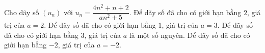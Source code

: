 \begin{ex}
Cho dãy số $(u_n)$ với $u_n=\dfrac{4n^2+n+2}{an^2+5}$.
\choiceTF
{\True Để dãy số đã cho có giới hạn bằng $2$, giá trị của $a=2$.}
{Để dãy số đã cho có giới hạn bằng $1$, giá trị của $a=3$.}
{Để dãy số đã cho có giới hạn bằng $3$, giá trị của $a$ là một số nguyên.}
{\True Để dãy số đã cho có giới hạn bằng $-2$, giá trị của $a=-2$.}
\end{ex}
